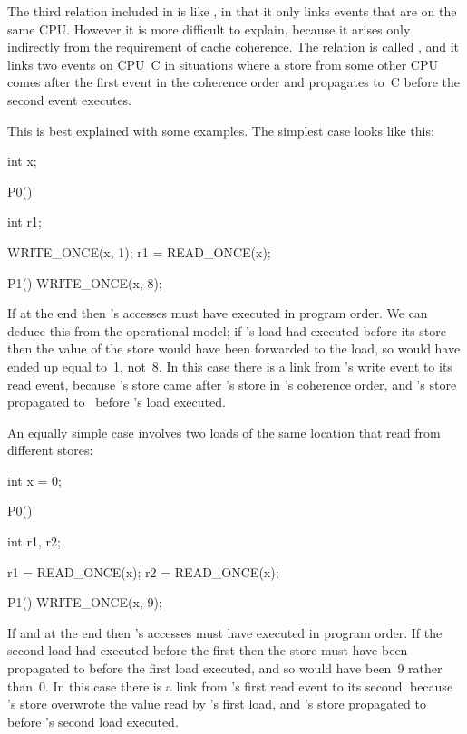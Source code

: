 The third relation included in  is like , in that it only links
events that are on the same CPU\@.
However it is more difficult to explain, because it arises only
indirectly from the requirement of cache coherence.
The relation is called , and it links two events on CPU~C
in situations where a store from some other CPU comes after the first
event in the coherence order and propagates to~C before the
second event executes.

This is best explained with some examples.
The simplest case looks like this:

\begin{VerbatimU}
	int x;

	P0()
	{
		int r1;

		WRITE_ONCE(x, 1);
		r1 = READ_ONCE(x);
	}

	P1()
	{
		WRITE_ONCE(x, 8);
	}
\end{VerbatimU}

If  at the end then 's accesses must have executed in program
order.
We can deduce this from the operational model; if 's load
had executed before its store then the value of the store would have
been forwarded to the load, so  would have ended up equal to~1,
not~8.
In this case there is a  link from 's write event to its read
event, because 's store came after 's store in 's coherence
order, and 's store propagated to~ before 's load executed.

An equally simple case involves two loads of the same location that
read from different stores:

\begin{VerbatimU}
	int x = 0;

	P0()
	{
		int r1, r2;

		r1 = READ_ONCE(x);
		r2 = READ_ONCE(x);
	}

	P1()
	{
		WRITE_ONCE(x, 9);
	}
\end{VerbatimU}

If  and  at the end then 's accesses
must have executed in program order.
If the second load had executed before the first then the 
store must have been propagated to  before the first load
executed, and so  would have been~9 rather than~0.
In this case there is a  link from 's first read
event to its second, because 's store overwrote the value read
by 's first load, and 's store propagated to~
before 's second load executed.

